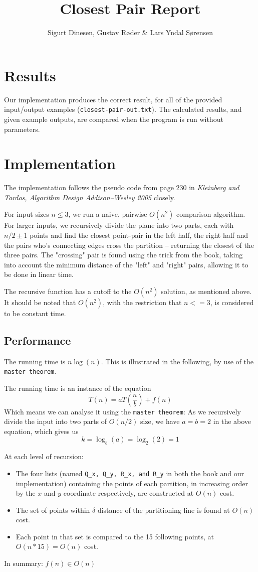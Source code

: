 \documentclass{tufte-handout}
\title{Closest Pair Report}
\author{Sigurt Dinesen, Gustav Røder \& Lars Yndal Sørensen}
\begin{document}
\maketitle

\section{Results}
Our implementation
produces the correct result, for all of the provided input/output examples
(\texttt{closest-pair-out.txt}). The calculated results, and given
example outputs, are compared when the program is run without parameters.

\section{Implementation}
The implementation follows the pseudo code from page 230 in \emph{Kleinberg and
Tardos, Algorithm Design Addison--Wesley 2005} closely.

For input sizes $n \leq 3$, we run a naive, pairwise $O(n^2)$ comparison algorithm.
For larger inputs, we recursively divide the plane into two parts, each with
$n/2 \pm 1$ points and find the closest point-pair in the left half, the right
half and the pairs who's connecting edges cross the partition -- returning the
closest of the three pairs.
The "crossing" pair is found using the trick from the book, taking into account
the minimum distance of the "left" and "right" pairs, allowing it to be done in
linear time.

The recursive function has a cutoff to the $O(n^2)$ solution, as mentioned
above.
It should be noted that $O(n^2)$, with the restriction that $n<=3$, is
considered to be constant time.

\subsection{Performance}
The running time is $n \log(n)$. This is illustrated in the following, by use of
the \texttt{master theorem}.

The running time is an instance of the equation
$$T(n) = a T\left(\frac{n}{b}\right) + f\left(n\right)$$
Which means we can analyse it using the \texttt{master theorem}:
As we recursively divide the input into two parts of $O(n/2)$ size, we have
$a=b=2$ in the above equation, which gives us
$$k = \log_b(a) = \log_2(2) = 1$$

At each level of recursion:
\begin{itemize}
	\item The four lists (named \texttt{Q\_x, Q\_y, R\_x, and R\_y} in both
		the book and our implementation) containing the points of each
		partition, in increasing order by the $x$ and $y$ coordinate
		respectively, are constructed at $O(n)$ cost.

	\item The set of points within $\delta$ distance of the partitioning
		line is found at $O(n)$ cost.

	\item Each point in that set is compared to the 15 following points, at
		$O(n*15) = O(n)$ cost.
\end{itemize}
In summary: $f\left(n\right) \in O(n)$
\end{document}
